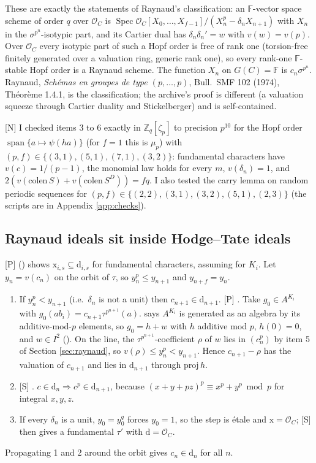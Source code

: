 \documentclass[11pt]{article}
\newcommand{\mP}{\textsf{[P]}}
\newcommand{\mS}{\textsf{[S]}}
\newcommand{\mN}{\textsf{[N]}}
\newcommand{\cO}{\mathcal O}
\newcommand{\Fq}{\mathbb F}
\theoremstyle{remark}
\begin{document}
These are exactly the statements of Raynaud's classification: an $\Fq$-vector space scheme of order $q$ over $\cO_C$ is $\operatorname{Spec}\cO_C[X_0,\ldots,X_{f-1}]/(X_n^p-\delta_nX_{n+1})$ with $X_n$ in the $\sigma^{p^n}$-isotypic part, and its Cartier dual has $\delta_n\delta_n'=w$ with $v(w)=v(p)$. Over $\cO_C$ every isotypic part of such a Hopf order is free of rank one (torsion-free finitely generated over a valuation ring, generic rank one), so every rank-one $\Fq$-stable Hopf order is a Raynaud scheme. The function $X_n$ on $G(C)=\Fq$ is $c_n\sigma^{p^n}$. Raynaud, \emph{Sch\'emas en groupes de type $(p,\ldots,p)$}, Bull.\ SMF 102 (1974), Th\'eor\`eme 1.4.1, is the classification; the archive's proof is different (a valuation squeeze through Cartier duality and Stickelberger) and is self-contained.

\mN{} I checked items 3 to 6 exactly in $\mathbb Z_q[\zeta_p]$ to precision $p^{10}$ for the Hopf order $\operatorname{span}\{a\mapsto\psi(ha)\}$ (for $f=1$ this is $\mu_p$) with $(p,f)\in\{(3,1),(5,1),(7,1),(3,2)\}$: fundamental characters have $v(c)=1/(p-1)$, the monomial law holds for every $m$, $v(\delta_n)=1$, and $2(v(\mathrm{colen}\,S)+v(\mathrm{colen}\,S^D))=fq$. I also tested the carry lemma on random periodic sequences for $(p,f)\in\{(2,2),(3,1),(3,2),(5,1),(2,3)\}$ (the scripts are in Appendix \ref{app:checks}).

\subsection{Raynaud ideals sit inside Hodge--Tate ideals}
\mP{}  () shows $\mathrm{x}_{i,s}\subseteq\mathrm{d}_{i,s}$ for fundamental characters, assuming  for $K_i$. Let $y_n=v(c_n)$ on the orbit of $\tau$, so $y_n^p\le y_{n+1}$ and $y_{n+f}=y_n$.
\begin{enumerate}[nosep]
\item If $y_n^p<y_{n+1}$ (i.e.\ $\delta_n$ is not a unit) then $c_{n+1}\in\mathrm{d}_{n+1}$. \mP{} . Take $g_0\in A^{K_i}$ with $g_0(ab_i)=c_{n+1}\tau^{p^{n+1}}(a)$.  says $A^{K_i}$ is generated as an algebra by its additive-mod-$p$ elements, so $g_0=h+w$ with $h$ additive mod $p$, $h(0)=0$, and $w\in I^2$ (). On the line, the $\tau^{p^{n+1}}$-coefficient $\rho$ of $w$ lies in $(c_n^p)$ by item 5 of Section \ref{sec:raynaud}, so $v(\rho)\le y_n^p<y_{n+1}$. Hence $c_{n+1}-\rho$ has the valuation of $c_{n+1}$ and lies in $\mathrm{d}_{n+1}$ through $\mathrm{proj}\,h$.
\item \mS{} . $c\in\mathrm{d}_n\Rightarrow c^p\in\mathrm{d}_{n+1}$, because $(x+y+pz)^p\equiv x^p+y^p\bmod p$ for integral $x,y,z$.
\item If every $\delta_n$ is a unit, $y_0=y_0^{q}$ forces $y_0=1$, so the step is \'etale and $\mathrm{x}=\cO_C$; \mS{}  then gives a fundamental $\tau'$ with $\mathrm{d}=\cO_C$.
\end{enumerate}
Propagating 1 and 2 around the orbit gives $c_{n}\in\mathrm{d}_{n}$ for all $n$.
\end{document}
